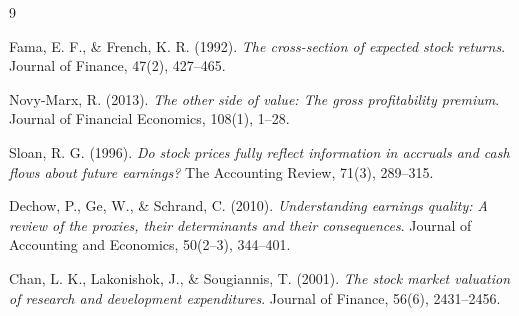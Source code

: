 \documentclass[a4paper,10pt]{article}
\begin{document}
\newpage
\begin{thebibliography}{9}

Fama, E. F., \& French, K. R. (1992).
\textit{The cross-section of expected stock returns}.
Journal of Finance, 47(2), 427--465.

Novy-Marx, R. (2013).
\textit{The other side of value: The gross profitability premium}.
Journal of Financial Economics, 108(1), 1--28.

Sloan, R. G. (1996).
\textit{Do stock prices fully reflect information in accruals and cash flows
about future earnings?}
The Accounting Review, 71(3), 289--315.

Dechow, P., Ge, W., \& Schrand, C. (2010).
\textit{Understanding earnings quality: A review of the proxies,
their determinants and their consequences}.
Journal of Accounting and Economics, 50(2--3), 344--401.

Chan, L. K., Lakonishok, J., \& Sougiannis, T. (2001).
\textit{The stock market valuation of research and development expenditures}.
Journal of Finance, 56(6), 2431--2456.

\end{thebibliography}
\end{document}
